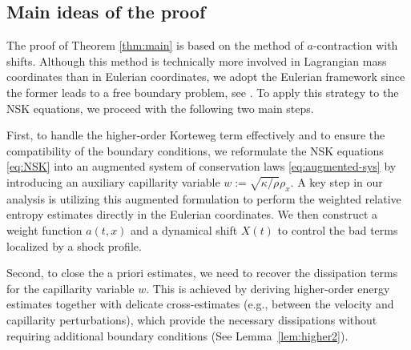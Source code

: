 \documentclass[11pt,reqno]{amsart}
\numberwithin{equation}{section} %
\begin{document}
\subsection{Main ideas of the proof}
The proof of Theorem \ref{thm:main} is based on the method of $a$-contraction with shifts. Although this method is technically more involved in Lagrangian mass coordinates than in Eulerian coordinates, we adopt the Eulerian framework since the former leads to a free boundary problem, see \cite[Section 4]{KNZ03}. To apply this strategy to the NSK equations, we proceed with the following two main steps.

First, to handle the higher-order Korteweg term effectively and to ensure the compatibility of the boundary conditions, we reformulate the NSK equations \eqref{eq:NSK} into an augmented system of conservation laws \eqref{eq:augmented-sys} by introducing an auxiliary capillarity variable $w := \sqrt{\kappa/\rho}\rho_x$. A key step in our analysis is utilizing this augmented formulation to perform the weighted relative entropy estimates directly in the Eulerian coordinates. %
We then construct a weight function $a(t,x)$ and a dynamical shift $X(t)$ to control the bad terms localized by a shock profile.

Second, to close the a priori estimates, we need to recover the dissipation terms for the capillarity variable $w$. This is achieved by deriving higher-order energy estimates together with delicate cross-estimates (e.g., between the velocity and capillarity perturbations), which provide the necessary dissipations without requiring additional boundary conditions (See Lemma~\ref{lem:higher2}).
\end{document}
